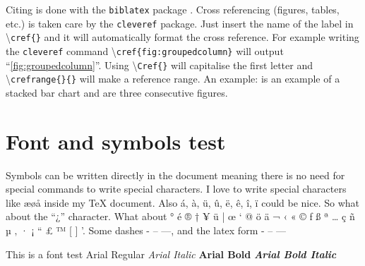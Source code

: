 Citing is done with the \texttt{biblatex} package \cite{biblatex}. Cross referencing (figures, tables, etc.) is taken care by the \texttt{cleveref} package. Just insert the name of the label in \textbackslash \texttt{cref\{\}} and it will automatically format the cross reference. For example writing the \texttt{cleveref} command \textbackslash \texttt{cref\{fig:groupedcolumn\}} will output ``\cref{fig:groupedcolumn}''. Using \textbackslash \texttt{Cref\{\}} will capitalise the first letter and \textbackslash \texttt{crefrange\{\}\{\}} will make a reference range. An example:  is an example of a stacked bar chart and  are three consecutive figures.

\section{Font and symbols test}
Symbols can be written directly in the document meaning there is no need for special commands to write special characters. I love to write special characters like æøå inside my \TeX{} document. Also á, à, ü, û, ë, ê, î, ï could be nice. So what about the ``¿'' character. What about ° é ® † ¥ ü | œ ‘ @ ö ä ¬ ‹ « © ƒ ß ª … ç ñ µ ‚ · ¡ “ £ ™ [ ] '. Some dashes - – —, and the latex form - -- ---

This is a font test \newline
Arial Regular \newline
\textit{Arial Italic} \newline
\textbf{Arial Bold} \newline
\textbf{\textit{Arial Bold Italic}}
